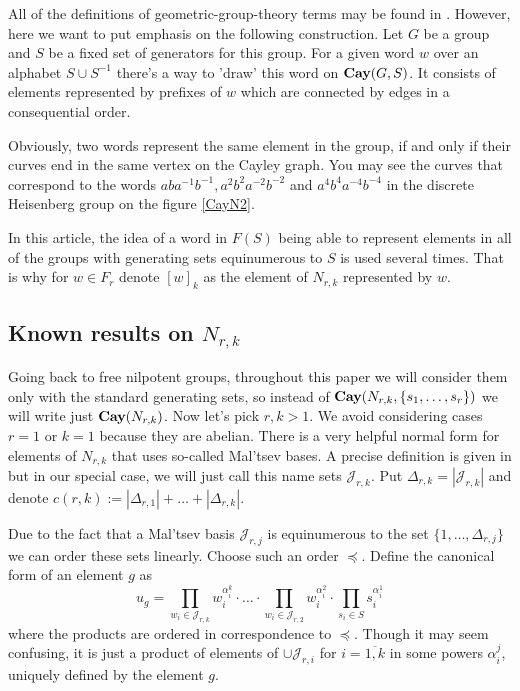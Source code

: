 \documentclass[11pt]{amsart}
\theoremstyle{plain}
\theoremstyle{definition}
\numberwithin{equation}{section}
\newcommand{\Cay}{\text{\bf Cay}}
\newcommand{\N}{N_{r,k}}
\newcommand{\JJ}{\mathcal{J}_{r,k}}
\begin{document}
All of the definitions of geometric-group-theory terms may be found in \cite{hours}. However, here we want to put emphasis on the following construction. Let $G$ be a group and $S$ be a fixed set of generators for this group. For a given word $w$ over an alphabet $S \cup S^{-1}$ there's a way to 'draw' this word on $\Cay(G,S)$. It consists of elements represented by prefixes of $w$ which are connected by edges in a consequential order. 

Obviously, two words represent the same element in the group, if and only if their curves end in the same vertex on the Cayley graph. You may see the curves that correspond to the words $aba^{-1}b^{-1}, a^2b^2a^{-2}b^{-2}$ and $a^4b^4a^{-4}b^{-4}$ in the discrete Heisenberg group on the figure \ref{CayN2}. 

In this article, the idea of a word in $F(S)$ being able to represent elements in all of the groups with generating sets equinumerous to $S$ is used several times. That is why for $w\in F_r$ denote $[w]_k$ as the element of $N_{r,k}$ represented by $w$.


\subsection{Known results on $\N$}
Going back to free nilpotent groups, throughout this paper we will consider them only with the standard generating sets, so instead of $\Cay(\N,\{s_1,\ldots,s_r\})$ we will write just $\Cay(\N)$. Now let's pick $r,k>1$. We avoid considering cases $r=1$ or $k=1$ because they are abelian. There is a very helpful normal form for elements of $\N$ that uses so-called Mal'tsev bases. A precise definition is given in \cite{Random} but in our special case, we will just call this name sets $\JJ$. Put $\Delta_{r,k} = |\JJ|$ and denote $c(r,k) := |\Delta_{r,1}| + \ldots +|\Delta_{r,k}|$.

Due to the fact that a Mal'tsev basis $\mathcal{J}_{r,j}$ is equinumerous to the set $\{1,\ldots, \Delta_{r,j}\}$ we can order these sets linearly. Choose such an order $\preccurlyeq$. Define the canonical form of an element $g$ as 
\begin{equation}\label{word pres}
    u_g = \prod_{w_i \in \mathcal{J}_{r,k}}w_i^{\alpha^{k}_i} \cdot\ldots\cdot \prod_{w_i \in \mathcal{J}_{r,2}}w_i^{\alpha^2_i}\cdot \prod_{s_i \in S}s_i^{\alpha^1_i}
\end{equation}
where the products are ordered in correspondence to $\preccurlyeq$.
Though it may seem confusing, it is just a product of elements of $\cup \mathcal{J}_{r,i}$ for $i = \overline{1,k}$ in some powers $\alpha_i^j$, uniquely defined by the element $g$.
\end{document}
